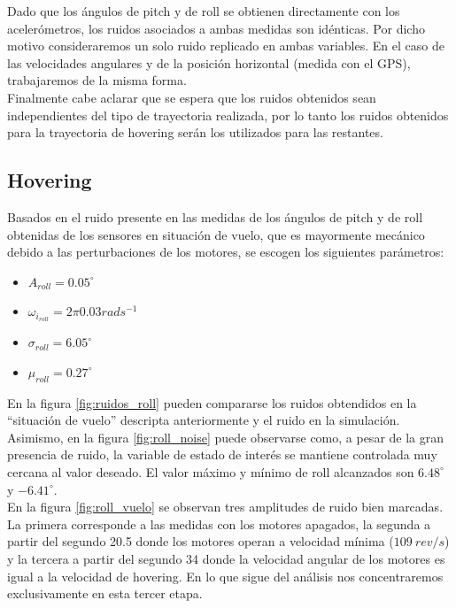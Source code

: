 \documentclass[main]{subfiles}
\begin{document}
Dado que los \'angulos de pitch y de roll se obtienen directamente con los aceler\'ometros, los ruidos asociados a ambas medidas son id\'enticas. Por dicho motivo consideraremos un solo ruido replicado en ambas variables. En el caso de las velocidades angulares y de la posici\'on horizontal (medida con el GPS), trabajaremos de la misma forma.\\ 

Finalmente cabe aclarar que se espera que los ruidos obtenidos sean independientes del tipo de trayectoria realizada, por lo tanto los ruidos obtenidos para la trayectoria de hovering ser\'an los utilizados para las restantes. 
\subsection{Hovering}

Basados en el ruido presente en las medidas de los \'angulos de pitch y de roll obtenidas de los sensores en situaci\'on de vuelo, que es mayormente mec\'anico debido a las perturbaciones de los motores, se escogen los siguientes par\'ametros:

\begin{itemize}
\item $A_{roll} = 0.05^\circ$
\item $\omega_{i_{roll}} = 2\pi 0.03 rads^{-1}$
\item $\sigma_{roll} = 6.05^\circ$
\item $\mu_{roll} = 0.27 ^\circ$
\end{itemize}

En la figura \ref{fig:ruidos_roll} pueden compararse los ruidos obtendidos en la ``situaci\'on de vuelo'' descripta anteriormente y el ruido en la simulaci\'on. Asimismo, en la figura \ref{fig:roll_noise} puede observarse como, a pesar de la gran presencia de ruido, la variable de estado de inter\'es se mantiene controlada muy cercana al valor deseado. El valor m\'aximo y m\'inimo de roll alcanzados son $6.48^\circ$ y $-6.41^\circ$.\\

En la figura \ref{fig:roll_vuelo} se observan tres amplitudes de ruido bien marcadas. La primera corresponde a las medidas con los motores apagados, la segunda a partir del segundo 20.5 donde los motores operan a velocidad m\'inima ($109 \: rev/s$) y la tercera a partir del segundo 34 donde la velocidad angular de los motores es igual a la velocidad de hovering. En lo que sigue del an\'alisis nos concentraremos exclusivamente en esta tercer etapa.\\
\end{document}
